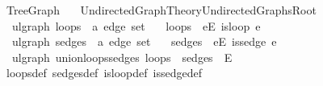 %
\begin{isabellebody}%
%
%
\isadelimdocument
%
\endisadelimdocument
%
\isatagdocument
%
\isamarkuptrue%
%
\endisatagdocument
{\isafolddocument}%
%
\isadelimdocument
%
\endisadelimdocument
%
\isadelimtheory
%
\endisadelimtheory
%
\isatagtheory
{}\isamarkupfalse%
\ Tree{\isacharunderscore}{\kern0pt}Graph\isanewline
\ \ \ Undirected{\isacharunderscore}{\kern0pt}Graph{\isacharunderscore}{\kern0pt}Theory{\isachardot}{\kern0pt}Undirected{\isacharunderscore}{\kern0pt}Graphs{\isacharunderscore}{\kern0pt}Root\isanewline
{}%
\endisatagtheory
{\isafoldtheory}%
%
\isadelimtheory
%
\endisadelimtheory
%
\isadelimdocument
%
\endisadelimdocument
%
\isatagdocument
%
\isamarkuptrue%
%
\endisatagdocument
{\isafolddocument}%
%
\isadelimdocument
%
\endisadelimdocument
{}\isamarkupfalse%
\ {\isacharparenleft}{\kern0pt}\ ulgraph{\isacharparenright}{\kern0pt}\ loops\ {\isacharcolon}{\kern0pt}{\isacharcolon}{\kern0pt}\ {\isachardoublequoteopen}{\isacharprime}{\kern0pt}a\ edge\ set{\isachardoublequoteclose}\ \isanewline
\ \ {\isachardoublequoteopen}loops\ {\isacharequal}{\kern0pt}\ {\isacharbraceleft}{\kern0pt}e{\isasymin}E{\isachardot}{\kern0pt}\ is{\isacharunderscore}{\kern0pt}loop\ e{\isacharbraceright}{\kern0pt}{\isachardoublequoteclose}\isanewline
\isanewline
{}\isamarkupfalse%
\ {\isacharparenleft}{\kern0pt}\ ulgraph{\isacharparenright}{\kern0pt}\ sedges\ {\isacharcolon}{\kern0pt}{\isacharcolon}{\kern0pt}\ {\isachardoublequoteopen}{\isacharprime}{\kern0pt}a\ edge\ set{\isachardoublequoteclose}\ \isanewline
\ \ {\isachardoublequoteopen}sedges\ {\isacharequal}{\kern0pt}\ {\isacharbraceleft}{\kern0pt}e{\isasymin}E{\isachardot}{\kern0pt}\ is{\isacharunderscore}{\kern0pt}sedge\ e{\isacharbraceright}{\kern0pt}{\isachardoublequoteclose}\isanewline
\isanewline
{}\isamarkupfalse%
\ {\isacharparenleft}{\kern0pt}\ ulgraph{\isacharparenright}{\kern0pt}\ union{\isacharunderscore}{\kern0pt}loops{\isacharunderscore}{\kern0pt}sedges{\isacharcolon}{\kern0pt}\ {\isachardoublequoteopen}loops\ {\isasymunion}\ sedges\ {\isacharequal}{\kern0pt}\ E{\isachardoublequoteclose}\isanewline
%
\isadelimproof
\ \ %
\endisadelimproof
%
\isatagproof
{}\isamarkupfalse%
\ loops{\isacharunderscore}{\kern0pt}def\ sedges{\isacharunderscore}{\kern0pt}def\ is{\isacharunderscore}{\kern0pt}loop{\isacharunderscore}{\kern0pt}def\ is{\isacharunderscore}{\kern0pt}sedge{\isacharunderscore}{\kern0pt}def\ \isamarkupfalse%

\end{isabellebody}
